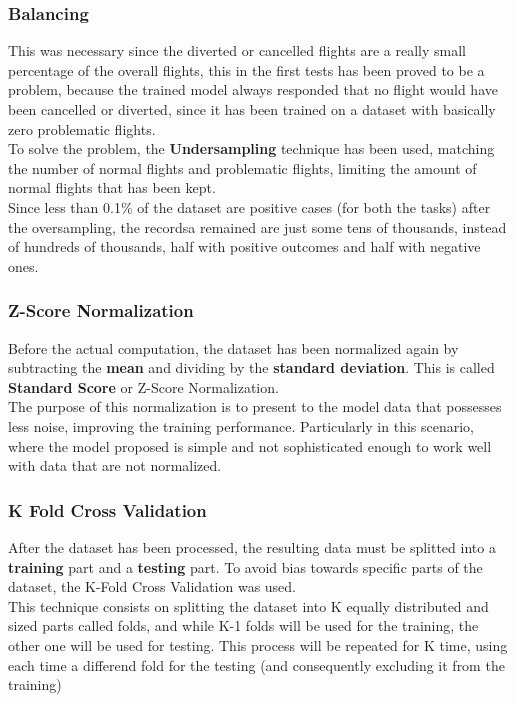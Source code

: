 \documentclass[
	letterpaper, %
	10pt, %
]{class}
\begin{document}
\subsubsection{Balancing}

This was necessary since the diverted or cancelled flights are a really small percentage of the overall flights,
this in the first tests has been proved to be a problem, because the trained model always responded that no flight would have been cancelled or diverted, since it has been trained on a dataset with basically zero problematic flights.\\

To solve the problem, the \textbf{Undersampling} technique has been used, matching the number of normal flights and problematic flights, limiting the amount of normal flights that has been kept.\\

Since less than 0.1\% of the dataset are positive cases (for both the tasks) after the oversampling, the recordsa remained are just some tens of thousands, instead of hundreds of thousands, half with positive outcomes and half with negative ones.

\subsubsection{Z-Score Normalization}
Before the actual computation, the dataset has been normalized again by subtracting the \textbf{mean} and dividing by the \textbf{standard deviation}. This is called \textbf{Standard Score} \cite{normalization} or Z-Score Normalization.\\

The purpose of this normalization is to present to the model data that possesses less noise, improving the training performance. Particularly in this scenario, where the model proposed is simple and not sophisticated enough to work well with data that are not normalized.

\subsubsection{K Fold Cross Validation}
After the dataset has been processed, the resulting data must be splitted into a \textbf{training} part and a \textbf{testing} part. To avoid bias towards specific parts of the dataset, the K-Fold Cross Validation \cite{crossvalidation} was used.\\

This technique consists on splitting the dataset into K equally distributed and sized parts called folds, and while K-1 folds will be used for the training, the other one will be used for testing. This process will be repeated for K time, using each time a differend fold for the testing (and consequently excluding it from the training)\\
\end{document}
